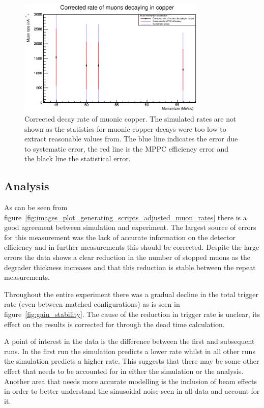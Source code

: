 \begin{figure}[hptb]
  \centering
    \includegraphics[width=0.8\textwidth]{images/plot_generating_scripts/adjusted_muon_rates_cu.eps}
  \caption{Corrected decay rate of muonic copper. The simulated rates are not shown as the statistics for muonic copper decays were too low to extract reasonable values from. The blue line indicates the error due to systematic error, the red line is the MPPC efficiency error and the black line the statistical error.}
  \label{fig:images_plot_generating_scripts_adjusted_muon_rates_cu}
\end{figure}

\subsection{Analysis} %
\label{sub:mom_analysis}
As can be seen from figure~\ref{fig:images_plot_generating_scripts_adjusted_muon_rates} there is a good agreement between simulation and experiment. The largest source of errors for this measurement was the lack of accurate information on the detector efficiency and in further measurements this should be corrected. Despite the large errors the data shows a clear reduction in the number of stopped muons as the degrader thickness increases and that this reduction is stable between the repeat measurements.

Throughout the entire experiment there was a gradual decline in the total trigger rate (even between matched configurations) as is seen in figure~\ref{fig:gain_stability}. The cause of the reduction in trigger rate is unclear, its effect on the results is corrected for through the dead time calculation. 

A point of interest in the data is the difference between the first and subsequent runs. In the first run the simulation predicts a lower rate whilst in all other runs the simulation predicts a higher rate. This suggests that there may be some other effect that needs to be accounted for in either the simulation or the analysis. Another area that needs more accurate modelling is the inclusion of beam effects in order to better understand the sinusoidal noise seen in all data and account for it.

